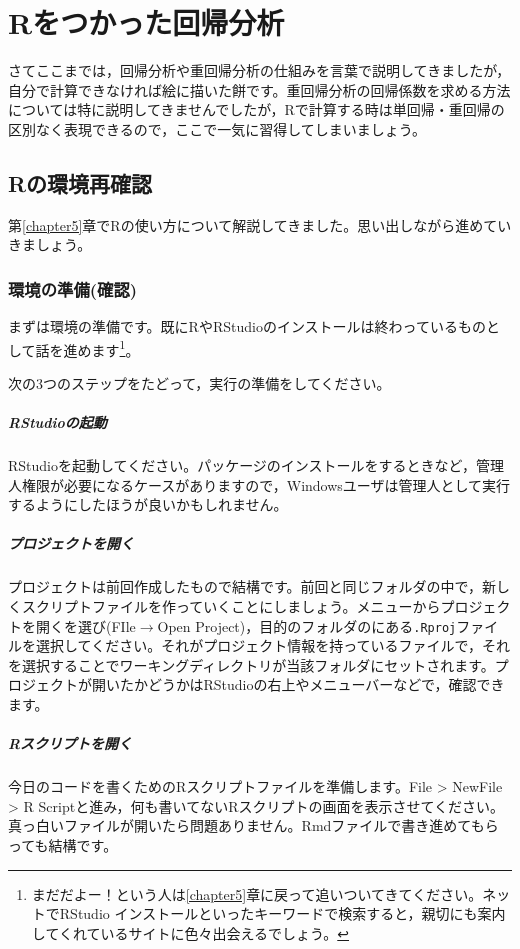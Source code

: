 \documentclass{ltjbook}
\begin{document}
 
\VerbatimFootnotes
\chapter{Rをつかった回帰分析} 
\label{chapter11} 

さてここまでは，回帰分析や重回帰分析の仕組みを言葉で説明してきましたが，自分で計算できなければ絵に描いた餅です。重回帰分析の回帰係数を求める方法については特に説明してきませんでしたが，Rで計算する時は単回帰・重回帰の区別なく表現できるので，ここで一気に習得してしまいましょう。

\section{Rの環境再確認}
第\ref{chapter5}章でRの使い方について解説してきました。思い出しながら進めていきましょう。

\subsection{環境の準備(確認)}
まずは環境の準備です。既にRやRStudioのインストールは終わっているものとして話を進めます\footnote{まだだよー！という人は\ref{chapter5}章に戻って追いついてきてください。ネットでRStudio インストールといったキーワードで検索すると，親切にも案内してくれているサイトに色々出会えるでしょう。}。

次の3つのステップをたどって，実行の準備をしてください。
\paragraph{RStudioの起動}RStudioを起動してください。パッケージのインストールをするときなど，管理人権限が必要になるケースがありますので，Windowsユーザは管理人として実行するようにしたほうが良いかもしれません。
\paragraph{プロジェクトを開く}プロジェクトは前回作成したもので結構です。前回と同じフォルダの中で，新しくスクリプトファイルを作っていくことにしましょう。メニューからプロジェクトを開くを選び(FIle$\to$Open Project)，目的のフォルダのにある\texttt{.Rproj}ファイルを選択してください。それがプロジェクト情報を持っているファイルで，それを選択することでワーキングディレクトリが当該フォルダにセットされます。プロジェクトが開いたかどうかはRStudioの右上やメニューバーなどで，確認できます。
\paragraph{Rスクリプトを開く}今日のコードを書くためのRスクリプトファイルを準備します。File > NewFile > R Scriptと進み，何も書いてないRスクリプトの画面を表示させてください。真っ白いファイルが開いたら問題ありません。Rmdファイルで書き進めてもらっても結構です。
\end{document}
